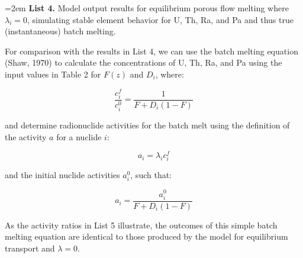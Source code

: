 \documentclass[draft]{agujournal2019}
\begin{document}
\hangindent=2em
    \textbf{List 4.} Model output results for equilibrium porous flow melting where $\lambda_i = 0$, simulating stable element behavior for U, Th, Ra, and Pa and thus true (instantaneous) batch melting.

\bigskip

For comparison with the results in List 4, we can use the batch melting equation (Shaw, 1970) to calculate the concentrations of U, Th, Ra, and Pa using the input values in Table 2 for $F(z)$ and $D_i$, where:

\begin{linenomath*}
\begin{equation}
    \frac{c_i^f}{c_i^0} = \frac{1}{F + D_i(1-F)}\label{eq:61}
\end{equation}
\end{linenomath*}

and determine radionuclide activities for the batch melt using the definition of the activity $a$ for a nuclide $i$:

\begin{linenomath*}
\begin{equation}
    a_i = \lambda_i c_i^f\label{eq:62}
\end{equation}
\end{linenomath*}

and the initial nuclide activities $a_i^0$, such that:

\begin{linenomath*}
\begin{equation}
    a_i = \frac{a_i^0}{F + D_i (1 -  F)}\label{eq:63}
\end{equation}
\end{linenomath*}

As the activity ratios in List 5 illustrate, the outcomes of this simple batch melting equation are identical to those produced by the model for equilibrium transport and $\lambda=0$.
\end{document}
